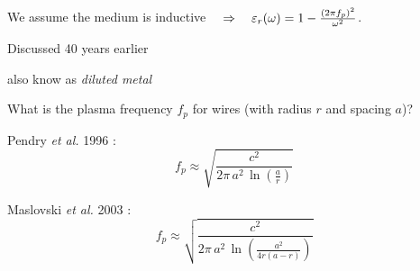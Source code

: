 We assume the medium is inductive $\quad \Rightarrow \quad  \varepsilon_r(\omega) = 1 - \frac{(2\pi f_p)^2}{\omega^2}$. 

Discussed 40 years earlier \cite[p. 54]{brown1953artificial} %

also know as \textit{diluted metal}

What is the plasma frequency $f_p$ for wires (with radius $r$ and spacing $a$)? 


Pendry \textit{et al.} 1996 \cite{pendry1996extremely}: 
\begin{equation} f_p \approx \sqrt{\frac{c^2}{2\pi \, a^2 \, \ln(\frac{a}{r})}} \label{eq_fp_pendry}\end{equation}

\cite{pendry1996extremely}

Maslovski \textit{et al.} 2003 \cite{maslovski2002wire}: 
\begin{equation} f_p \approx \sqrt{\frac{c^2}{2\pi \, a^2 \, \ln\left(\frac{a^2}{4r (a-r)}\right)}} \label{eq_fp_maslovski}\end{equation}
\cite{maslovski2002wire}

